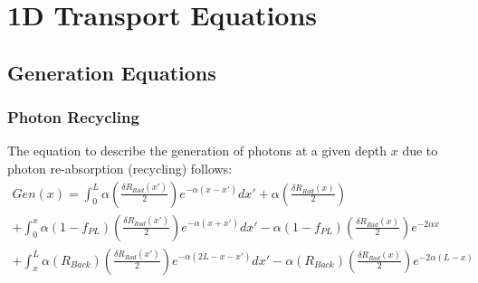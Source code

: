 \documentclass[11pt]{article}
\begin{document}
	
	\setcounter{page}{1}	
	
\section{1D Transport Equations}	
\subsection{Generation Equations}
\subsubsection*{Photon Recycling}
\par The equation to describe the generation of photons at a given depth $ x $ due to photon re-absorption (recycling) follows:
\begin{equation} \label{eq:Gen}
\begin{split}
	Gen(x) = \int_{0}^{L} \alpha \left(\frac{\delta R_{Rad}(x')}{2}\right) e^{-\alpha (x-x')} dx' + \alpha \left(\frac{\delta R_{Rad}(x)}{2}\right)\\
	 + \int_{0}^{x} \alpha \left(1-f_{PL}\right) \left(\frac{\delta R_{Rad}(x')}{2}\right) e^{-\alpha (x+x')} dx'
	 - \alpha \left(1-f_{PL}\right) \left(\frac{\delta R_{Rad}(x)}{2}\right)  e^{-2\alpha x}\\
	 + \int_{x}^{L} \alpha \left(R_{Back}\right) \left(\frac{\delta R_{Rad}(x')}{2}\right) e^{-\alpha (2L-x-x')} dx'
	 - \alpha \left(R_{Back}\right) \left(\frac{\delta R_{Rad}(x)}{2}\right)  e^{-2\alpha (L-x)}\\
\end{split}
\end{equation}
\end{document}
